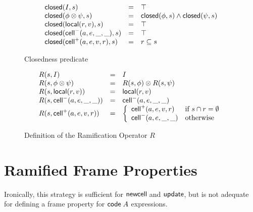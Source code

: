 \begin{figure}
\mbox{}
  \begin{displaymath}
    \begin{array}{lcl}
      \mathsf{closed}({I}, {s}) & = & \top \\
      \mathsf{closed}({\phi \otimes \psi}, {s}) & = & \mathsf{closed}({\phi}, {s}) \land \mathsf{closed}({\psi}, {s}) \\ 
      \mathsf{closed}({\mathsf{local}({r}, {v})}, {s}) & = & \top \\
      \mathsf{closed}({\mathsf{cell}^{-}({a}, {e}, {\_}, {\_})}, {s}) & = & \top \\
      \mathsf{closed}({\mathsf{cell}^{+}({a}, {e}, {v}, {r})}, {s}) & = & r \subseteq s \\
    \end{array}
  \end{displaymath}
\caption{Closedness predicate}
\label{closedness}  
\end{figure}

\begin{figure}
\mbox{}
  \begin{displaymath}
    \begin{array}{lcl}
      R(s, I)                 & = & I \\
      R(s, \phi \otimes \psi) & = & R(s, \phi) \otimes R(s, \psi) \\
      R(s, \mathsf{local}({r}, {v}))   & = & \mathsf{local}({r}, {v}) \\
      R(s, \mathsf{cell}^{-}({a}, {e}, {\_}, {\_}))    & = & \mathsf{cell}^{-}({a}, {e}, {\_}, {\_}) \\
      R(s, \mathsf{cell}^{+}({a}, {e}, {v}, {r})) & = & \left\{\begin{array}{ll}
                                                \mathsf{cell}^{+}({a}, {e}, {v}, {r}) 
                                              & \mbox{if } s \cap r = \emptyset \\
                                                \mathsf{cell}^{-}({a}, {e}, {\_}, {\_})
                                              & \mbox{otherwise}
                                              \end{array}
                                       \right.
    \end{array}
  \end{displaymath}
\caption{Definition of the Ramification Operator $R$}
\label{ramify-def}
\end{figure}

\section{Ramified Frame Properties}

Ironically, this strategy is sufficient for $\mathsf{newcell}\;$and
$\mathsf{update}$, but is not adequate for defining a frame property
for $\mathsf{code}\;{A}$ expressions. 

